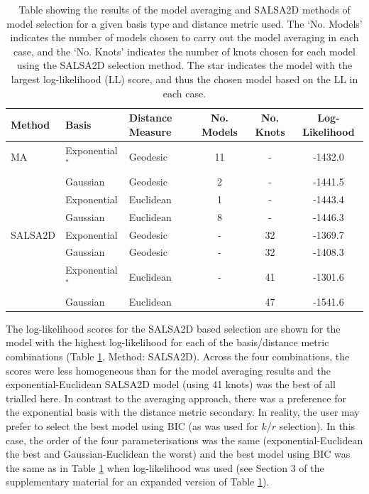 \documentclass[letterpaper]{interact}
\begin{document}
\vspace{1cm}

\begin{table}[!ht]
\centering
\caption{Table showing the results of the model averaging and SALSA2D methods of model selection for a given basis type and distance metric used. The `No. Models' indicates the number of models chosen to carry out the model averaging in each case, and the `No. Knots' indicates the number of knots chosen for each model using the SALSA2D selection method. The star indicates the model with the largest log-likelihood (LL) score, and thus the chosen model based on the LL in each case.}
\vspace{0.5cm}
\begin{tabular}{l |l|l|c|c|c}
Method & Basis & Distance Measure & No. Models & No. Knots & Log-Likelihood\\
\hline
MA & Exponential$^*$ & Geodesic & 11 & - & -1432.0\\
 &  Gaussian & Geodesic & 2 & -& -1441.5\\
 & Exponential & Euclidean & 1 & -& -1443.4\\
 &  Gaussian & Euclidean & 8 & - & -1446.3\\
 \hline
SALSA2D & Exponential & Geodesic & - & 32 & -1369.7\\
& Gaussian & Geodesic & - & 32 & -1408.3 \\
& Exponential$^*$ & Euclidean & - & 41 & -1301.6\\
& Gaussian & Euclidean & & 47 & -1541.6\\
\end{tabular}
\label{tab:mrsearesult}
\end{table}

 The log-likelihood scores for the SALSA2D based selection are shown for the model with the highest log-likelihood for each of the basis/distance metric combinations (Table \ref{tab:mrsearesult}, Method: SALSA2D). Across the four combinations, the scores were less homogeneous than for the model averaging results and the exponential-Euclidean SALSA2D model (using 41 knots) was the best of all trialled here. In contrast to the averaging approach, there was a preference for the exponential basis with the distance metric secondary. In reality, the user may prefer to select the best model using BIC (as was used for $k$/$r$ selection). In this case, the order of the four parameterisations was the same (exponential-Euclidean the best and Gaussian-Euclidean the worst) and the best model using BIC was the same as in Table \ref{tab:mrsearesult} when log-likelihood was used (see Section 3 of the supplementary material for an expanded version of Table \ref{tab:mrsearesult}).
\end{document}
